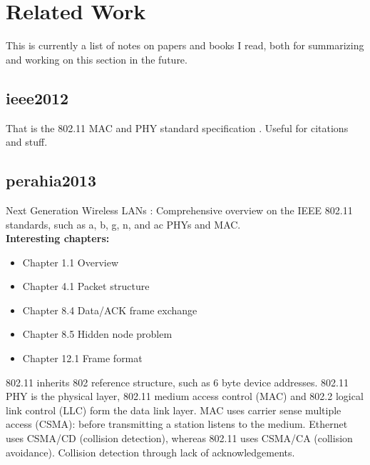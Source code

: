 
\chapter{Related Work}\label{ch:relatedwork}

\glsresetall %


This is currently a list of notes on papers and books I read, both for summarizing and working on this section in the future.



\section{ieee2012}

That is the 802.11 MAC and PHY standard specification \cite{ieee2012}. Useful for citations and stuff.



\section{perahia2013}

Next Generation Wireless LANs \cite{perahia2013}: Comprehensive overview on the IEEE 802.11 standards, such as a, b, g, n, and ac PHYs and MAC.\\

\textbf{Interesting chapters:}

\begin{itemize}
	\item Chapter 1.1 Overview
	\item Chapter 4.1 Packet structure
	\item Chapter 8.4 Data/ACK frame exchange
	\item Chapter 8.5 Hidden node problem
	\item Chapter 12.1 Frame format
\end{itemize}

802.11 inherits 802 reference structure, such as 6 byte device addresses. 802.11 PHY is the physical layer, 802.11 medium access control (MAC) and 802.2 logical link control (LLC) form the data link layer. MAC uses carrier sense multiple access (CSMA): before transmitting a station listens to the medium. Ethernet uses CSMA/CD (collision detection), whereas 802.11 uses CSMA/CA (collision avoidance). Collision detection through lack of acknowledgements.\\

